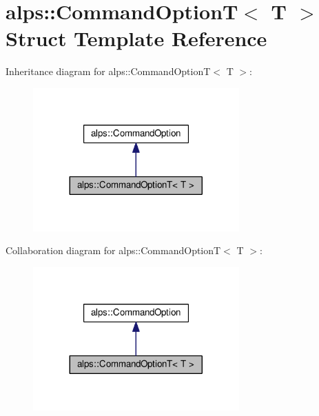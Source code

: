 \hypertarget{structalps_1_1CommandOptionT}{}\section{alps\+:\+:Command\+OptionT$<$ T $>$ Struct Template Reference}
\label{structalps_1_1CommandOptionT}


Inheritance diagram for alps\+:\+:Command\+OptionT$<$ T $>$\+:
\nopagebreak
\begin{figure}[H]
\begin{center}
\leavevmode
\includegraphics[width=224pt]{structalps_1_1CommandOptionT__inherit__graph}
\end{center}
\end{figure}


Collaboration diagram for alps\+:\+:Command\+OptionT$<$ T $>$\+:
\nopagebreak
\begin{figure}[H]
\begin{center}
\leavevmode
\includegraphics[width=224pt]{structalps_1_1CommandOptionT__coll__graph}
\end{center}
\end{figure}
